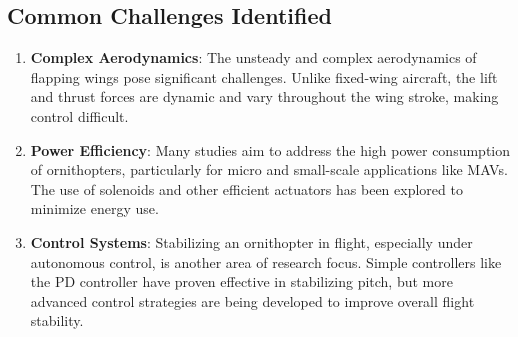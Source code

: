 \subsection{Common Challenges Identified}
\begin{enumerate}
    \item \textbf{Complex Aerodynamics}: The unsteady and complex aerodynamics of flapping wings pose significant challenges. Unlike fixed-wing aircraft, the lift and thrust forces are dynamic and vary throughout the wing stroke, making control difficult.
    
    \item \textbf{Power Efficiency}: Many studies aim to address the high power consumption of ornithopters, particularly for micro and small-scale applications like MAVs. The use of solenoids and other efficient actuators has been explored to minimize energy use.
    
    \item \textbf{Control Systems}: Stabilizing an ornithopter in flight, especially under autonomous control, is another area of research focus. Simple controllers like the PD controller have proven effective in stabilizing pitch, but more advanced control strategies are being developed to improve overall flight stability.
\end{enumerate}